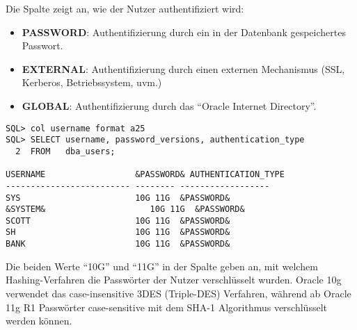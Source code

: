         Die Spalte  zeigt an, wie der Nutzer
        authentifiziert wird:
        \begin{itemize}
          \item \textbf{PASSWORD}: Authentifizierung durch ein in der Datenbank
          gespeichertes Passwort.
          \item \textbf{EXTERNAL}: Authentifizierung durch einen externen
          Mechanismus (SSL, Kerberos, Betriebssystem, uvm.)
          \item \textbf{GLOBAL}: Authentifizierung durch das
          \enquote{Oracle Internet Directory}.
        \end{itemize}
        \begin{lstlisting}[caption={In der Datenbank gespeicherte Nutzerdaten
        abrufen},label=admin207,language=oracle_sql,alsolanguage=sqlplus]
SQL> col username format a25
SQL> SELECT username, password_versions, authentication_type
  2  FROM   dba_users;

USERNAME                  &PASSWORD& AUTHENTICATION_TYPE
------------------------- -------- ------------------
SYS                       10G 11G  &PASSWORD&
&SYSTEM&                     10G 11G  &PASSWORD&
SCOTT                     10G 11G  &PASSWORD&
SH                        10G 11G  &PASSWORD&
BANK                      10G 11G  &PASSWORD&
        \end{lstlisting}
        Die beiden Werte \enquote{10G} und \enquote{11G} in der Spalte
         geben an, mit welchem Hashing-Verfahren die
        Passwörter der Nutzer verschlüsselt wurden. Oracle 10g verwendet das
        case-insensitive 3DES (Triple-DES) Verfahren, während ab Oracle 11g R1
        Passwörter case-sensitive mit dem SHA-1 Algorithmus verschlüsselt
        werden können.

